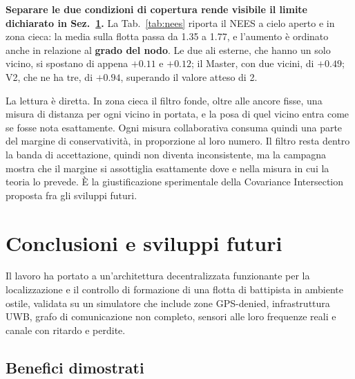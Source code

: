 \documentclass[conference,9pt]{IEEEtran}
\begin{document}
\textbf{Separare le due condizioni di copertura rende visibile il limite
dichiarato in Sez.~\ref{sec:conclusioni}.} La Tab.~\ref{tab:nees} riporta il
NEES a cielo aperto e in zona cieca: la media sulla flotta passa da 1.35 a 1.77,
e l'aumento \`e ordinato anche in relazione al \textbf{grado del nodo}. Le due ali esterne,
che hanno un solo vicino, si spostano di appena $+0.11$ e $+0.12$; il Master,
con due vicini, di $+0.49$; V2, che ne ha tre, di $+0.94$, superando il valore
atteso di 2.

La lettura \`e diretta. In zona cieca il filtro fonde, oltre alle ancore fisse,
una misura di distanza per ogni vicino in portata, e la posa di quel vicino
entra come se fosse nota esattamente. Ogni misura collaborativa consuma quindi
una parte del margine di conservativit\`a, in proporzione al loro numero. Il
filtro resta dentro la banda di accettazione, quindi non diventa inconsistente,
ma la campagna mostra che il margine si assottiglia esattamente dove e nella
misura in cui la teoria lo prevede. \`E la giustificazione sperimentale della
Covariance Intersection proposta fra gli sviluppi futuri.

\section{Conclusioni e sviluppi futuri}
\label{sec:conclusioni}

Il lavoro ha portato a un'architettura decentralizzata funzionante per la
localizzazione e il controllo di formazione di una flotta di battipista in
ambiente ostile, validata su un simulatore che include zone GPS-denied,
infrastruttura UWB, grafo di comunicazione non completo, sensori alle loro
frequenze reali e canale con ritardo e perdite.

\subsection{Benefici dimostrati}
\end{document}
